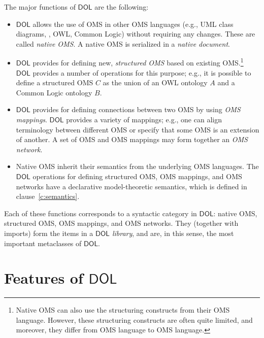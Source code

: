 \documentclass[10pt,fleqn,final]{scrreprt}
\newcommand*{\DOL}{\ensuremath{\mathsf{DOL}}\xspace}
\newcommand{\clauserefname}{clause}
\newcommand{\cref}[1]{\clauserefname~\ref{#1}}
\newenvironment{definitions}[0]{\medskip }{}
\begin{document}
\begin{definitions}
The major functions of \DOL are the following: 
\begin{itemize}
		\item \DOL allows the use of OMS in other OMS languages (e.g., UML class diagrams, \CASL, 
		OWL, Common Logic) without requiring any changes. These are called \emph{native OMS}.  A native OMS is serialized in a \emph{native document}.   
		\item \DOL provides for defining new, \emph{structured OMS} based on existing OMS.\footnote{Native OMS can also use the structuring constructs from their OMS language. However, these structuring constructs are often quite limited, and moreover, they differ from OMS language to OMS language.} \DOL provides a number of operations for this purpose; e.g.,
		it is possible to define a structured OMS $C$ as the union of an OWL
		ontology $A$ and a Common Logic ontology $B$.
		\item \DOL provides for defining connections between two OMS by using 
		\emph{OMS mappings}. \DOL provides a variety of mappings; e.g.,  one can align terminology 
		between different OMS or specify that some OMS is an extension of another. A set of OMS
		and OMS mappings may form together an \emph{OMS network}.
		\item Native OMS inherit their semantics from the underlying OMS languages. The \DOL
		 operations for defining structured OMS, 
		OMS mappings, and OMS networks have a declarative model-theoretic semantics, which is 
		 defined in \cref{c:semantics}.  
\end{itemize}
 
 Each of these functions corresponds to a syntactic category in \DOL: native OMS, structured
 OMS, OMS mappings, and OMS networks. They (together with imports) form the items in a
\emph{\DOL library}, and are, in this sense, the most important metaclasses of \DOL. 


 





\section{Features of \DOL}\label{c:req:overview}


\end{definitions}
\end{document}
